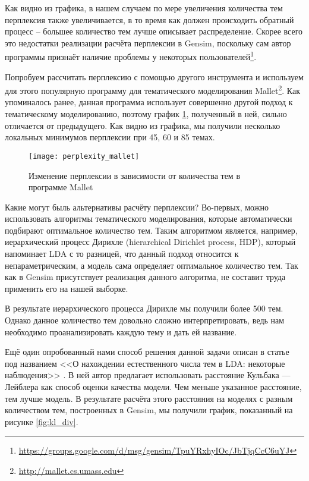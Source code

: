Как видно из графика, в нашем случаем по мере увеличения количества тем перплексия также увеличивается, в то время как должен происходить обратный процесс -- большее количество тем лучше описывает распределение. Скорее всего это недостатки реализации расчёта перплексии в Gensim, поскольку сам автор программы признаёт наличие проблемы у некоторых пользователей\footnote{\href{https://groups.google.com/d/msg/gensim/TpuYRxhyIOc/JbTjqCcC6uYJ}{https://groups.google.com/d/msg/gensim/TpuYRxhyIOc/JbTjqCcC6uYJ}}.

Попробуем рассчитать перплексию с помощью другого инструмента и используем для этого популярную программу для тематического моделирования Mallet\footnote{\href{http://mallet.cs.umass.edu}{http://mallet.cs.umass.edu}}. Как упоминалось ранее, данная программа использует совершенно другой подход к тематическому моделированию, поэтому график \ref{fig:perplexity_mallet}, полученный в ней, сильно отличается от предыдущего. Как видно из графика, мы получили несколько локальных минимумов перплексии при 45, 60 и 85 темах.

\begin{figure}
	\centering
    \texttt{[image: perplexity\_mallet]}
    \caption{Изменение перплексии в зависимости от количества тем в программе Mallet}
    \label{fig:perplexity_mallet}
\end{figure}

Какие могут быль альтернативы расчёту перплексии? Во-первых, можно использовать алгоритмы тематического моделирования, которые автоматически подбирают оптимальное количество тем. Таким алгоритмом является, например, иерархический процесс Дирихле (hierarchical Dirichlet process, HDP), который напоминает LDA с то разницей, что данный подход относится к непараметрическим, а модель сама определяет оптимальное количество тем. Так как в Gensim присутствует реализация данного алгоритма, не составит труда применить его на нашей выборке.

В результате иерархического процесса Дирихле мы получили более 500 тем. Однако данное количество тем довольно сложно интерпретировать, ведь нам необходимо проанализировать каждую тему и дать ей название.

Ещё один опробованный нами способ решения данной задачи описан в статье под названием <<О нахождении естественного числа тем в LDA: некоторые наблюдения>> \cite{Arun_KL}. В ней автор предлагает использовать расстояние Кульбака — Лейблера как способ оценки качества модели. Чем меньше указанное расстояние, тем лучше модель. В результате расчёта этого расстояния на моделях с разным количеством тем, построенных в Gensim, мы получили график, показанный на рисунке \ref{fig:kl_div}.

